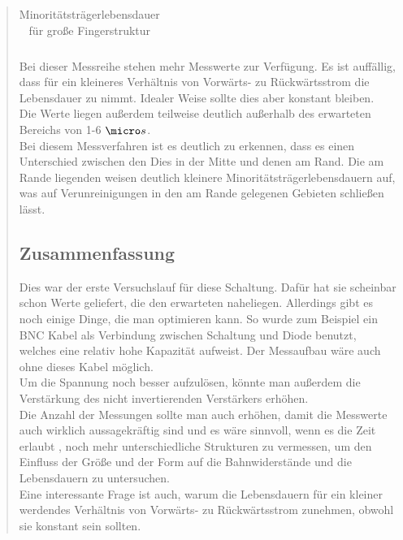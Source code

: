 \begin{quote}
\begin{table}[H]
\begin{addmargin}[-0.5cm]{3cm}
\begin{tabular}{|p{5cm}|p{5cm}|p{5cm}|}
                    \end{tabular}
              \end{addmargin}
              \caption{Minoritätsträgerlebensdauer für große Fingerstruktur}
              \label{tab:grossetab2}
            \end{table}

     \vspace{2em}
      	
     Bei dieser Messreihe stehen mehr Messwerte zur Verfügung. Es ist auffällig, 
     dass für ein kleineres Verhältnis von Vorwärts- zu Rückwärtsstrom die 
     Lebensdauer zu nimmt. Idealer Weise sollte dies aber konstant bleiben.\\
     Die Werte liegen außerdem teilweise deutlich außerhalb des erwarteten
     Bereichs von 1-6 $\micro s$. \\
     Bei diesem Messverfahren ist es deutlich zu erkennen, dass es einen 
     Unterschied zwischen den Dies in der Mitte und denen am Rand. Die am Rande 
     liegenden weisen deutlich kleinere Minoritätsträgerlebensdauern auf, was 
     auf Verunreinigungen in den am Rande gelegenen Gebieten schließen lässt.  	
	
	 \subsection{Zusammenfassung}
	 
	 Dies war der erste Versuchslauf für diese Schaltung. Dafür hat sie 
	 scheinbar schon Werte geliefert, die den erwarteten naheliegen. Allerdings
	 gibt es noch einige Dinge, die man optimieren kann. So wurde zum Beispiel 
	 ein BNC Kabel als Verbindung zwischen Schaltung und Diode benutzt, welches
	 eine relativ hohe Kapazität aufweist. Der Messaufbau wäre auch ohne dieses
	 Kabel möglich.\\
	 Um die Spannung noch besser aufzulösen, könnte man außerdem die 
	 Verstärkung des nicht invertierenden Verstärkers erhöhen.\\
	 Die Anzahl der Messungen sollte man auch erhöhen, damit die Messwerte auch
	 wirklich aussagekräftig sind und es wäre sinnvoll, wenn es die Zeit erlaubt
	 , noch mehr unterschiedliche Strukturen zu vermessen, um den Einfluss der 
	 Größe und der Form auf die Bahnwiderstände und die Lebensdauern zu 
	 untersuchen.\\
	 Eine interessante Frage ist auch, warum die Lebensdauern für ein kleiner 
	 werdendes Verhältnis von Vorwärts- zu Rückwärtsstrom zunehmen, obwohl sie 
	 konstant sein sollten.
	 

\end{quote}
